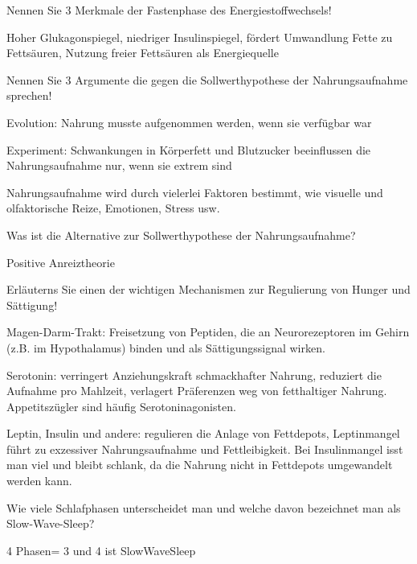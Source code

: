 \documentclass[10pt, a4paper]{exam}
\begin{document}
\begin{questions}
  \question Nennen Sie 3 Merkmale der Fastenphase des Energiestoffwechsels!
  \begin{solution}
    Hoher Glukagonspiegel, niedriger Insulinspiegel, fördert Umwandlung Fette zu Fettsäuren, Nutzung freier Fettsäuren als Energiequelle
  \end{solution}

  \question Nennen Sie 3 Argumente die gegen die Sollwerthypothese der Nahrungsaufnahme sprechen!
  \begin{solution}
    \begin{itemize*}
      \item Evolution: Nahrung musste aufgenommen werden, wenn sie verfügbar war
      \item Experiment: Schwankungen in Körperfett und Blutzucker beeinflussen die Nahrungsaufnahme nur, wenn sie extrem sind
      \item Nahrungsaufnahme wird durch vielerlei Faktoren bestimmt, wie visuelle und olfaktorische
      Reize, Emotionen, Stress usw.
    \end{itemize*}
  \end{solution}

  \question Was ist die Alternative zur Sollwerthypothese der Nahrungsaufnahme?
  \begin{solution}
    Positive Anreiztheorie
  \end{solution}

  \question Erläuterns Sie einen der wichtigen Mechanismen zur Regulierung von Hunger und Sättigung!
  \begin{solution}
    \begin{itemize*}
      \item Magen-Darm-Trakt: Freisetzung von Peptiden, die an Neurorezeptoren im Gehirn (z.B. im Hypothalamus) binden und als Sättigungssignal wirken.
      \item Serotonin: verringert Anziehungskraft schmackhafter Nahrung, reduziert die Aufnahme pro Mahlzeit, verlagert Präferenzen weg von fetthaltiger Nahrung. Appetitszügler sind häufig Serotoninagonisten.
      \item Leptin, Insulin und andere: regulieren die Anlage von Fettdepots, Leptinmangel führt zu exzessiver Nahrungsaufnahme und Fettleibigkeit. Bei Insulinmangel isst man viel und bleibt schlank, da die Nahrung nicht in Fettdepots umgewandelt werden kann.
    \end{itemize*}
  \end{solution}

  \question Wie viele Schlafphasen unterscheidet man und welche davon bezeichnet man als Slow-Wave-Sleep?
  \begin{solution}
    4 Phasen= 3 und 4 ist SlowWaveSleep
  \end{solution}


\end{questions}
\end{document}
